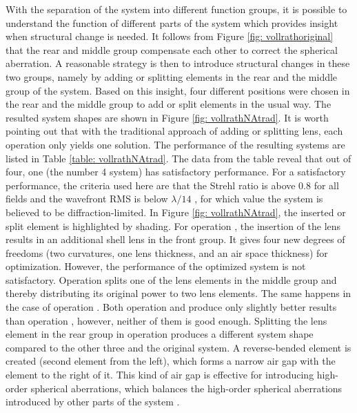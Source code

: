 With the separation of the system into different function groups, it is possible to understand the function of different parts of the system which provides insight when structural change is needed. It follows from Figure \ref{fig: vollrathoriginal} that the rear and middle group compensate each other to correct the spherical aberration. A reasonable strategy is then to introduce structural changes in these two groups, namely by adding or splitting elements in the rear and the middle group of the system. Based on this insight, four different positions were chosen in the rear and the middle group to add or split elements in the usual way. The resulted system shapes are shown in Figure \ref{fig: vollrathNAtrad}. It is worth pointing out that with the traditional approach of adding or splitting lens, each operation only yields one solution. The performance of the resulting systems are listed in Table \ref{table: vollrathNAtrad}. The data from the table reveal that out of four, one (the number 4 system) has satisfactory performance. For a satisfactory performance, the criteria used here are that the Strehl ratio is above 0.8 for all fields and the wavefront RMS is below $\lambda/14$ \cite{patentvollrath}, for which value the system is believed to be diffraction-limited. In Figure \ref{fig: vollrathNAtrad}, the inserted or split element is highlighted by shading. For operation , the insertion of the lens results in an additional shell lens in the front group. It gives four new degrees of freedoms (two curvatures, one lens thickness, and an air space thickness) for optimization. However, the performance of the optimized system is not satisfactory. Operation  splits one of the lens elements in the middle group and thereby distributing its original power to two lens elements. The same happens in the case of operation . Both operation  and  produce only slightly better results than operation , however, neither of them is good enough. Splitting the lens element in the rear group in operation  produces a different system shape compared to the other three and the original system. A reverse-bended element is created (second element from the left), which forms a narrow air gap with the element to the right of it. This kind of air gap is effective for introducing high-order spherical aberrations, which balances the high-order spherical aberrations introduced by other parts of the system \cite{ZhangGross+2019+349+384}. 

